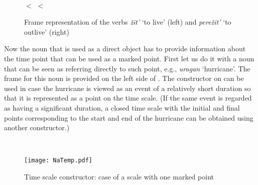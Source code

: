 \begin{figure}
\begin{minipage}{0.3\textwidth}
\end{minipage}\hfill%
\begin{minipage}{0.55\textwidth}\centering
{}\\
 $<$  $<$ 
\end{minipage}
\caption{Frame representation of the verbs \textit{\v{z}it'} `to live' (left) and \textit{pere\v{z}it'} `to outlive' (right) \label{frame:live}}
\end{figure}

Now the noun that is used as a direct object has to provide information about the time point that can be used as a marked point. First let us do it with a noun that can be seen as referring directly to such point, e.g., \textit{uragan} `hurricane'. The frame for this noun is provided on the left side of . The constructor on  can be used in case the hurricane is viewed as an event of a relatively short duration so that it is represented as a point on the time scale. (If the same event is regarded as having a significant duration, a closed time scale with the initial and final points corresponding to the start and end of the hurricane can be obtained using another constructor.) 

\begin{figure}
\begin{minipage}{0.65\textwidth}
\\
\end{minipage}%
\begin{minipage}{0.35\textwidth}
\texttt{[image: NaTemp.pdf]}
\end{minipage}
\caption{Time scale constructor: case of a scale with one marked point \label{constructor:time}}
\end{figure}

